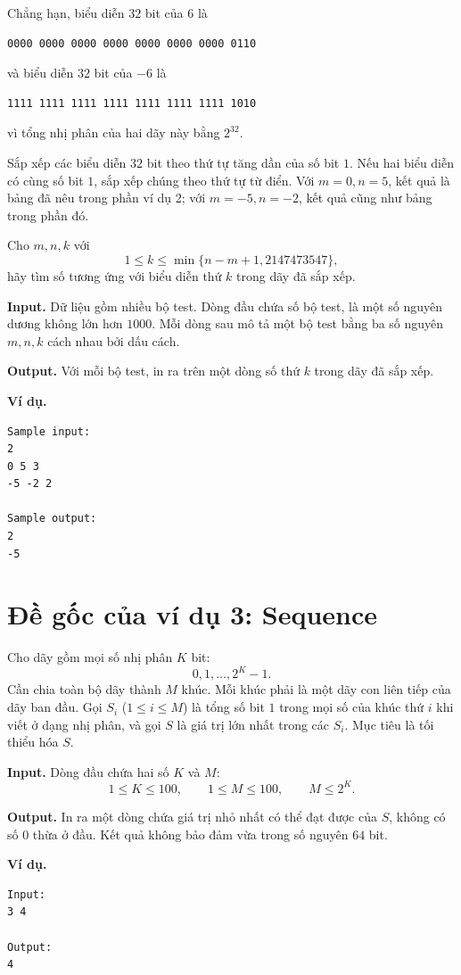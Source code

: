 \documentclass[11pt]{article}
\begin{document}
Chẳng hạn, biểu diễn $32$ bit của $6$ là
\begin{verbatim}
0000 0000 0000 0000 0000 0000 0000 0110
\end{verbatim}
và biểu diễn $32$ bit của $-6$ là
\begin{verbatim}
1111 1111 1111 1111 1111 1111 1111 1010
\end{verbatim}
vì tổng nhị phân của hai dãy này bằng $2^{32}$.

Sắp xếp các biểu diễn $32$ bit theo thứ tự tăng dần của số bit $1$. Nếu hai
biểu diễn có cùng số bit $1$, sắp xếp chúng theo thứ tự từ điển. Với
$m=0,n=5$, kết quả là bảng đã nêu trong phần ví dụ 2; với $m=-5,n=-2$, kết quả
cũng như bảng trong phần đó.

Cho $m,n,k$ với
\[
  1\le k\le \min\{n-m+1,2147473547\},
\]
hãy tìm số tương ứng với biểu diễn thứ $k$ trong dãy đã sắp xếp.

\textbf{Input.} Dữ liệu gồm nhiều bộ test. Dòng đầu chứa số bộ test, là một số
nguyên dương không lớn hơn $1000$. Mỗi dòng sau mô tả một bộ test bằng ba số
nguyên $m,n,k$ cách nhau bởi dấu cách.

\textbf{Output.} Với mỗi bộ test, in ra trên một dòng số thứ $k$ trong dãy đã
sắp xếp.

\textbf{Ví dụ.}
\begin{verbatim}
Sample input:
2
0 5 3
-5 -2 2

Sample output:
2
-5
\end{verbatim}

\section{Đề gốc của ví dụ 3: Sequence}

Cho dãy gồm mọi số nhị phân $K$ bit:
\[
  0,1,\ldots,2^K-1.
\]
Cần chia toàn bộ dãy thành $M$ khúc. Mỗi khúc phải là một dãy con liên tiếp của
dãy ban đầu. Gọi $S_i$ ($1\le i\le M$) là tổng số bit $1$ trong mọi số của
khúc thứ $i$ khi viết ở dạng nhị phân, và gọi $S$ là giá trị lớn nhất trong
các $S_i$. Mục tiêu là tối thiểu hóa $S$.

\textbf{Input.} Dòng đầu chứa hai số $K$ và $M$:
\[
  1\le K\le 100,\qquad 1\le M\le 100,\qquad M\le 2^K.
\]

\textbf{Output.} In ra một dòng chứa giá trị nhỏ nhất có thể đạt được của
$S$, không có số $0$ thừa ở đầu. Kết quả không bảo đảm vừa trong số nguyên
$64$ bit.

\textbf{Ví dụ.}
\begin{verbatim}
Input:
3 4

Output:
4
\end{verbatim}
\end{document}
